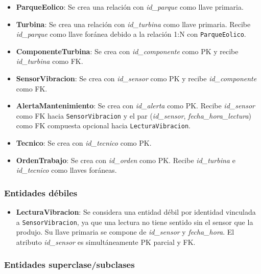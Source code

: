 \documentclass[11pt,a4paper]{article}
\begin{document}
\begin{itemize}
    \item \textbf{ParqueEolico}: Se crea una relación con
    \textit{id\_parque} como llave primaria.

    \item \textbf{Turbina}: Se crea una relación con
    \textit{id\_turbina} como llave primaria. Recibe \textit{id\_parque} como llave
    foránea debido a la relación 1:N con \texttt{ParqueEolico}.

    \item \textbf{ComponenteTurbina}: Se crea con \textit{id\_componente} como PK y
    recibe \textit{id\_turbina} como FK.

    \item \textbf{SensorVibracion}: Se crea con \textit{id\_sensor} como PK y recibe
    \textit{id\_componente} como FK.

    \item \textbf{AlertaMantenimiento}: Se crea con \textit{id\_alerta} como PK.
    Recibe \textit{id\_sensor} como FK hacia \texttt{SensorVibracion} y el par
    (\textit{id\_sensor}, \textit{fecha\_hora\_lectura}) como FK compuesta opcional
    hacia \texttt{LecturaVibracion}.

    \item \textbf{Tecnico}: Se crea con \textit{id\_tecnico} como PK.

    \item \textbf{OrdenTrabajo}: Se crea con \textit{id\_orden} como PK. Recibe
    \textit{id\_turbina} e \textit{id\_tecnico} como llaves foráneas.
\end{itemize}

\subsubsection{Entidades débiles}

\begin{itemize}
    \item \textbf{LecturaVibracion}: Se considera una entidad débil por identidad
    vinculada a \texttt{SensorVibracion}, ya que una lectura no tiene sentido sin el
    sensor que la produjo. Su llave primaria se compone de
    \textit{id\_sensor} y \textit{fecha\_hora}. El atributo
    \textit{id\_sensor} es simultáneamente PK parcial y FK.
\end{itemize}

\subsubsection{Entidades superclase/subclases}
\end{document}

